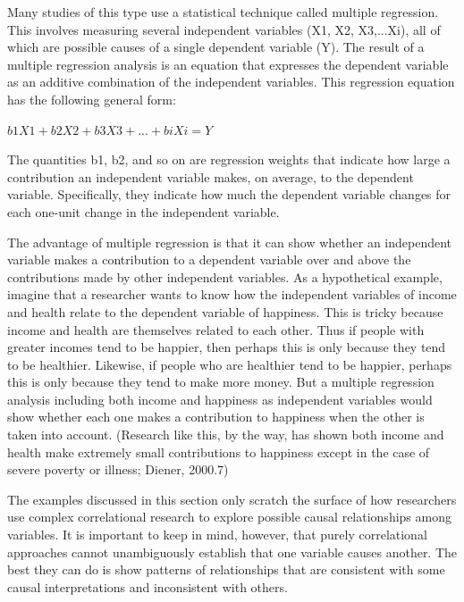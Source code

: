 Many studies of this type use a statistical technique called multiple regression. This involves measuring several independent variables (X1, X2, X3,...Xi), all of which are possible causes of a single dependent variable (Y). The result of a multiple regression analysis is an equation that expresses the dependent variable as an additive combination of the independent variables. This regression equation has the following general form:

$b1X1+ b2X2+ b3X3+ ... + biXi = Y$

The quantities b1, b2, and so on are regression weights that indicate how large a contribution an independent
variable makes, on average, to the dependent variable. Specifically, they indicate how much the dependent variable changes for each one-unit change in the independent variable.

The advantage of multiple regression is that it can show whether an independent variable makes a contribution to a dependent variable over and above the contributions made by other independent variables. As a hypothetical example, imagine that a researcher wants to know how the independent variables of income and health relate to the dependent variable of happiness. This is tricky because income and health are themselves related to each other. Thus if people with greater incomes tend to be happier, then perhaps this is only because they tend to be healthier. Likewise, if people who are healthier tend to be happier, perhaps this is only because they tend to make more money. But a multiple regression analysis including both income and happiness as independent variables would show whether each one makes a contribution to happiness when the other is taken into account. (Research like this, by the way, has shown both income and health make extremely small contributions to happiness except in the case of severe poverty or illness; Diener, 2000.7)

The examples discussed in this section only scratch the surface of how researchers use complex correlational research to explore possible causal relationships among variables. It is important to keep in mind, however, that purely correlational approaches cannot unambiguously establish that one variable causes another. The best they can do is show patterns of relationships that are consistent with some causal interpretations and inconsistent with others.

